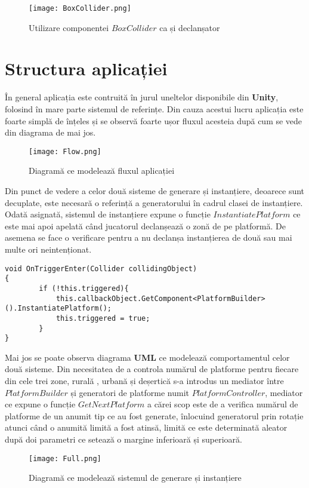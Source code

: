 \vspace{10mm}
\begin{figure}[H]
\centering
\texttt{[image: BoxCollider.png]} \par
\caption{Utilizare componentei $BoxCollider$ ca și declanșator}
\end{figure}

\section{Structura aplicației}

În general aplicația este contruită în jurul uneltelor disponibile din \textbf{Unity}, folosind în mare parte sistemul de referințe. Din cauza acestui lucru aplicația este foarte simplă de înțeles și se observă foarte ușor fluxul acesteia după cum se vede din diagrama de mai jos.\par

\begin{figure}[H]
\centering
\texttt{[image: Flow.png]} \par
\caption{Diagramă ce modelează fluxul aplicației}
\end{figure}

Din punct de vedere a celor două sisteme de generare și instanțiere, deoarece sunt decuplate, este necesară o referință a generatorului în cadrul clasei de instanțiere. Odată asignată, sistemul de instanțiere expune o funcție $InstantiatePlatform$ ce este mai apoi apelată când jucatorul declanșează o zonă de pe platformă. De asemena se face o verificare pentru a nu declanșa instanțierea de două sau mai multe ori neintenționat.\par

\begin{lstlisting}[caption=Apelul de instanțiere a unei platforme]
void OnTriggerEnter(Collider collidingObject)
{
        if (!this.triggered){
            this.callbackObject.GetComponent<PlatformBuilder>().InstantiatePlatform();
            this.triggered = true;
        }
}
\end{lstlisting}

Mai jos se poate observa diagrama \textbf{UML} ce modelează comportamentul celor două sisteme. Din necesitatea de a controla numărul de platforme pentru fiecare din cele trei zone, rurală , urbană și deșertică s-a introdus un mediator între $PlatformBuilder$ și generatori de platforme numit $PlatformController$, mediator ce expune o funcție $GetNextPlatform$ a cărei scop este de a verifica numărul de platforme de un anumit tip ce au fost generate, înlocuind generatorul prin rotație atunci când o anumită limită a fost atinsă, limită ce este determinată aleator după doi parametri ce setează o margine inferioară și superioară.\par

\vspace{10mm}
\begin{figure}[H]
\centering
\texttt{[image: Full.png]} \par
\caption{Diagramă ce modelează sistemul de generare și instanțiere}
\end{figure}

